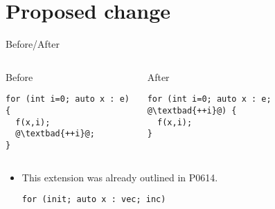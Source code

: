 \section{Proposed change}

\begin{frame}[t,fragile]{Before/After}
\begin{columns}[T]

\begin{block}{Before}
\begin{lstlisting}[escapechar=@]
for (int i=0; auto x : e) {
  f(x,i);
  @\textbad{++i}@;
}
\end{lstlisting}
\end{block}

\begin{block}{After}
\begin{lstlisting}[escapechar=@]
for (int i=0; auto x : e; @\textbad{++i}@) {
  f(x,i);
}
\end{lstlisting}
\end{block}

\end{columns}

\begin{itemize}
  \item This extension was already outlined in P0614.
\begin{lstlisting}
for (init; auto x : vec; inc)
\end{lstlisting}
\end{itemize}

\end{frame}
